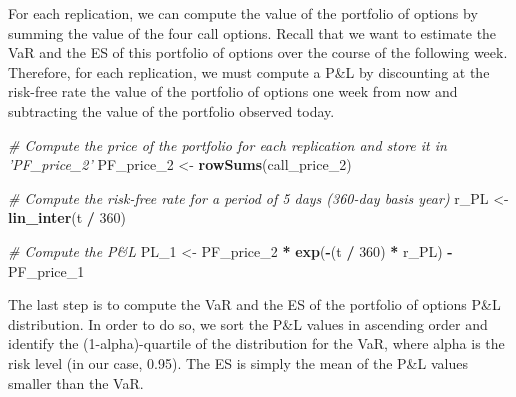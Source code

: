 \documentclass[]{article}
\newenvironment{Shaded}{\begin{snugshade}}{\end{snugshade}}
\newcommand{\CommentTok}[1]{\textcolor[rgb]{0.56,0.35,0.01}{\textit{#1}}}
\newcommand{\DecValTok}[1]{\textcolor[rgb]{0.00,0.00,0.81}{#1}}
\newcommand{\KeywordTok}[1]{\textcolor[rgb]{0.13,0.29,0.53}{\textbf{#1}}}
\newcommand{\NormalTok}[1]{#1}
\newcommand{\OperatorTok}[1]{\textcolor[rgb]{0.81,0.36,0.00}{\textbf{#1}}}
\newcommand{\StringTok}[1]{\textcolor[rgb]{0.31,0.60,0.02}{#1}}
\begin{document}
For each replication, we can compute the value of the portfolio of
options by summing the value of the four call options. Recall that we
want to estimate the VaR and the ES of this portfolio of options over
the course of the following week. Therefore, for each replication, we
must compute a P\&L by discounting at the risk-free rate the value of
the portfolio of options one week from now and subtracting the value of
the portfolio observed today.

\begin{Shaded}
\begin{Highlighting}[]
\CommentTok{# Compute the price of the portfolio for each replication and store it in 'PF_price_2'}
\NormalTok{PF_price_}\DecValTok{2}\NormalTok{ <-}\StringTok{ }\KeywordTok{rowSums}\NormalTok{(call_price_}\DecValTok{2}\NormalTok{)}

\CommentTok{# Compute the risk-free rate for a period of 5 days (360-day basis year)}
\NormalTok{r_PL <-}\StringTok{ }\KeywordTok{lin_inter}\NormalTok{(t }\OperatorTok{/}\StringTok{ }\DecValTok{360}\NormalTok{)}

\CommentTok{# Compute the P&L}
\NormalTok{PL_}\DecValTok{1}\NormalTok{ <-}\StringTok{ }\NormalTok{PF_price_}\DecValTok{2} \OperatorTok{*}\StringTok{ }\KeywordTok{exp}\NormalTok{(}\OperatorTok{-}\NormalTok{(t }\OperatorTok{/}\StringTok{ }\DecValTok{360}\NormalTok{) }\OperatorTok{*}\StringTok{ }\NormalTok{r_PL) }\OperatorTok{-}\StringTok{ }\NormalTok{PF_price_}\DecValTok{1}
\end{Highlighting}
\end{Shaded}

The last step is to compute the VaR and the ES of the portfolio of
options P\&L distribution. In order to do so, we sort the P\&L values in
ascending order and identify the (1-alpha)-quartile of the distribution
for the VaR, where alpha is the risk level (in our case, 0.95). The ES
is simply the mean of the P\&L values smaller than the VaR.
\end{document}
